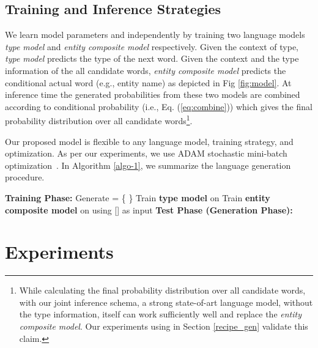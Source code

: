 \documentclass[11pt,a4paper]{article}
\begin{document}
\subsection{Training and Inference Strategies}

We learn model parameters  and  independently by training two language models {\it type model} and {\it entity composite model} respectively. Given the context of type, {\it type model} predicts the type of the next word. Given the context and the type information of the all candidate words, {\it entity composite model} predicts the conditional actual word (e.g., entity name) as depicted in Fig \ref{fig:model}. At inference time the generated probabilities from these two models are combined according to conditional probability (i.e., Eq. (\ref{eq:combine})) which gives the final probability distribution over all candidate words\footnote{While calculating the final probability distribution over all candidate words, with our joint inference schema, a strong state-of-art language model, without the type information, itself can work sufficiently well and replace the {\it entity composite model}. Our experiments using \cite{socher} in Section \ref{recipe_gen} validate this claim.}. 


Our proposed model is flexible to any language model, training strategy, and optimization. As per our experiments, we use ADAM stochastic mini-batch optimization~\cite{adam}. 
In Algorithm \ref{algo-1}, we summarize the language generation procedure.  




\begin{algorithm}[t]
\DontPrintSemicolon
{}
\KwOut{, , \{\}}
\vspace{5pt}
 {\bf Training Phase: \;}{
 Generate  = \{ \}\;
 Train \textbf{type model}  on \;
 Train \textbf{entity composite model}  on  using  [] as input\;
 }
 \vspace{5pt}
 {\bf Test Phase (Generation Phase):\;} {
  {
   \;
  }
 }
 \caption{\textbf{\small Language Generation}}
 \label{algo-1}
\end{algorithm}









\section{Experiments}
\label{experiments}
\end{document}

